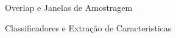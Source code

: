 \documentclass{beamer}
\begin{document}



\begin{frame}{Overlap e Janelas de Amostragem}
\color{black}
    \scalebox{.6}{}
    \scalebox{.6}{}
\end{frame}
\begin{frame}{Classificadores e Extração de Caracteristicas}
\color{black}
    \scalebox{.5}{}
    \scalebox{.5}{}
\end{frame}
\end{document}

